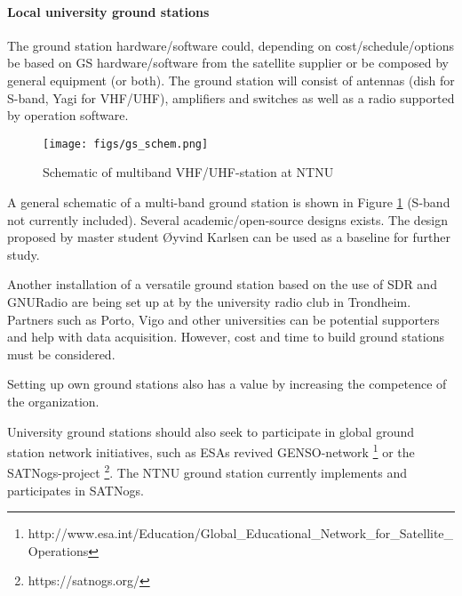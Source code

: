 \paragraph{Local university ground stations}

The ground station hardware/software could, depending on cost/schedule/options be based on GS hardware/software from the satellite supplier or be composed by general equipment (or both). The ground station will consist of antennas (dish for S-band, Yagi for VHF/UHF), amplifiers and switches as well as a radio supported by operation software. 

\begin{figure}[htbp]
	\centering
		\texttt{[image: figs/gs\_schem.png]}
	\caption{Schematic of multiband VHF/UHF-station at NTNU}
	\label{fig:gs_schem}
\end{figure}


A general schematic of a multi-band ground station is shown in Figure \ref{fig:gs_schem} (S-band not currently included). Several academic/open-source designs exists. The design proposed by master student {\O}yvind Karlsen \cite{karlsen_2017, ark_2017} can be used as a baseline for further study. 


Another installation of a versatile ground station based on the use of SDR and GNURadio are being set up at by the university radio club in Trondheim.
Partners such as Porto, Vigo and other universities can be potential supporters and help with data acquisition. However, cost and time to build ground stations must be considered. 

Setting up own ground stations also has a value by increasing the competence of the organization. 

University ground stations should also seek to participate in global ground station network initiatives, such as ESAs revived GENSO-network \footnote{http://www.esa.int/Education/Global\_Educational\_Network\_for\_Satellite\_Operations} or the SATNogs-project \footnote{https://satnogs.org/}. The NTNU ground station currently implements and participates in SATNogs.


